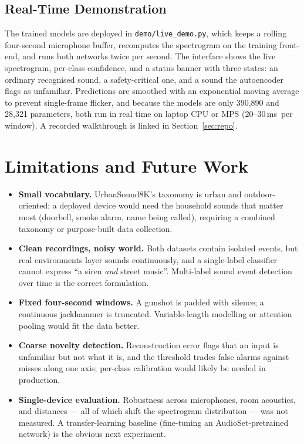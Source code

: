 \documentclass[11pt, a4paper]{article}
\newcommand{\cnnParams}{390{,}890}
\newcommand{\aeParams}{28{,}321}
\newcommand{\inferTime}{20--30\,ms}
\begin{document}
\subsection{Real-Time Demonstration}

The trained models are deployed in \texttt{demo/live\_demo.py}, which keeps a rolling four-second microphone buffer, recomputes the spectrogram on the training front-end, and runs both networks twice per second. The interface shows the live spectrogram, per-class confidence, and a status banner with three states: an ordinary recognised sound, a safety-critical one, and a sound the autoencoder flags as unfamiliar. Predictions are smoothed with an exponential moving average to prevent single-frame flicker, and because the models are only \cnnParams{} and \aeParams{} parameters, both run in real time on laptop CPU or MPS (\inferTime\ per window). A recorded walkthrough is linked in Section~\ref{sec:repo}.

\section{Limitations and Future Work}
\label{sec:limitations}

\begin{itemize}[leftmargin=2.2em]
    \item \textbf{Small vocabulary.} UrbanSound8K's taxonomy is urban and outdoor-oriented; a deployed device would need the household sounds that matter most (doorbell, smoke alarm, name being called), requiring a combined taxonomy or purpose-built data collection.
    \item \textbf{Clean recordings, noisy world.} Both datasets contain isolated events, but real environments layer sounds continuously, and a single-label classifier cannot express ``a siren \emph{and} street music''. Multi-label sound event detection over time is the correct formulation.
    \item \textbf{Fixed four-second windows.} A gunshot is padded with silence; a continuous jackhammer is truncated. Variable-length modelling or attention pooling would fit the data better.
    \item \textbf{Coarse novelty detection.} Reconstruction error flags that an input is unfamiliar but not what it is, and the threshold trades false alarms against misses along one axis; per-class calibration would likely be needed in production.
    \item \textbf{Single-device evaluation.} Robustness across microphones, room acoustics, and distances --- all of which shift the spectrogram distribution --- was not measured. A transfer-learning baseline (fine-tuning an AudioSet-pretrained network) is the obvious next experiment.
\end{itemize}
\end{document}
